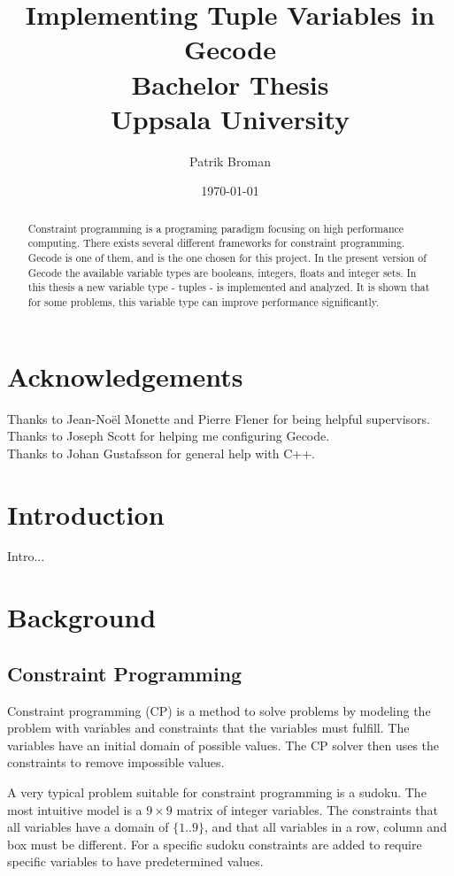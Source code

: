 \documentclass[a4paper,11pt]{article}
\title{\textbf{Implementing Tuple Variables in Gecode \\
	Bachelor Thesis \\
    Uppsala University  \\
  }
}
\author{Patrik Broman}
\date{\today}
\begin{document}
\maketitle

\begin{abstract}
Constraint programming is a programing paradigm focusing on high performance computing. There exists several different frameworks for constraint programming. Gecode is one of them, and is the one chosen for this project. In the present version of Gecode the available variable types are booleans, integers, floats and integer sets. In this thesis a new variable type - tuples - is implemented and analyzed. It is shown that for some problems, this variable type can improve performance significantly.
\end{abstract}

\setcounter{tocdepth}{2}

\section*{Acknowledgements}
Thanks to Jean-No\"{e}l Monette and Pierre Flener for being helpful supervisors. \\
Thanks to Joseph Scott for helping me configuring Gecode. \\
Thanks to Johan Gustafsson for general help with C++. \\

\section{Introduction}
Intro...

\section{Background}
\subsection{Constraint Programming}

Constraint programming (CP) is a method to solve problems by modeling the problem with variables and constraints that the variables must fulfill. The variables have an initial domain of possible values. The CP solver then uses the constraints to remove impossible values. 

A very typical problem suitable for constraint programming is a sudoku. The most intuitive model is a $9\times9$ matrix of integer variables. The constraints that all variables have a domain of $\{1..9\}$, and that all variables in a row, column and box must be different. For a specific sudoku constraints are added to require specific variables to have predetermined values.
\end{document}
